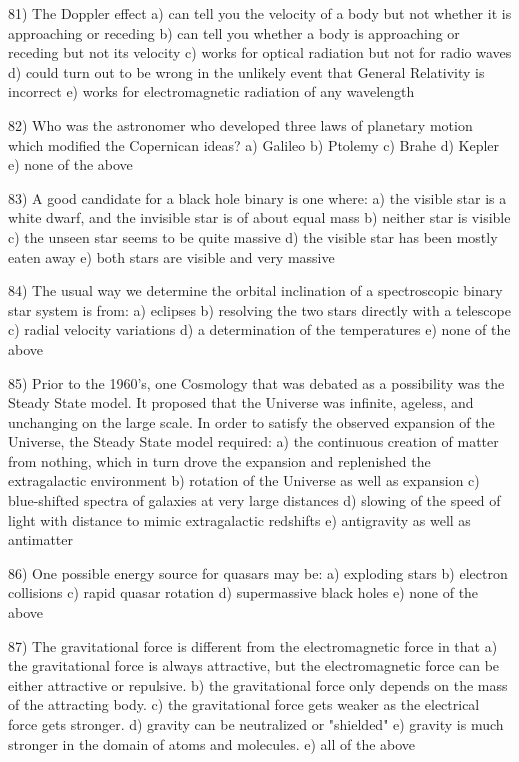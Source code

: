 81) The Doppler effect
a) can tell you the velocity of a body but not whether it is approaching
or receding
b) can tell you whether a body is approaching or receding but not its
velocity
c) works for optical radiation but not for radio waves
d) could turn out to be wrong in the unlikely event that General Relativity
is incorrect
e) works for electromagnetic radiation of any wavelength

82) Who was the astronomer who developed three laws of planetary motion
which modified the Copernican ideas?
a) Galileo b) Ptolemy c) Brahe d) Kepler e) none of the above

83) A good candidate for a black hole binary is one where:
a) the visible star is a white dwarf, and the invisible star is
of about equal mass
b) neither star is visible
c) the unseen star seems to be quite massive
d) the visible star has been mostly eaten away
e) both stars are visible and very massive

84) The usual way we determine the orbital inclination of a spectroscopic
binary star system is from:
a) eclipses b) resolving the two stars directly with a telescope
c) radial velocity variations d) a determination of the temperatures
e) none of the above

85) Prior to the 1960's, one Cosmology that was debated as a possibility was
the Steady State model. It proposed that the Universe was infinite,
ageless, and unchanging on the large scale. In order to satisfy the
observed expansion of the Universe, the Steady State model required:
a) the continuous creation of matter from nothing, which in turn drove the
expansion and replenished the extragalactic environment
b) rotation of the Universe as well as expansion
c) blue-shifted spectra of galaxies at very large distances
d) slowing of the speed of light with distance to mimic extragalactic
redshifts
e) antigravity as well as antimatter

86) One possible energy source for quasars may be:
a) exploding stars b) electron collisions
c) rapid quasar rotation d) supermassive black holes
e) none of the above

87) The gravitational force is different from the electromagnetic force in that
a) the gravitational force is always attractive, but the electromagnetic
force can be either attractive or repulsive.
b) the gravitational force only depends on the mass of the attracting body.
c) the gravitational force gets weaker as the electrical force gets stronger.
d) gravity can be neutralized or "shielded"
e) gravity is much stronger in the domain of atoms and molecules.
e) all of the above

